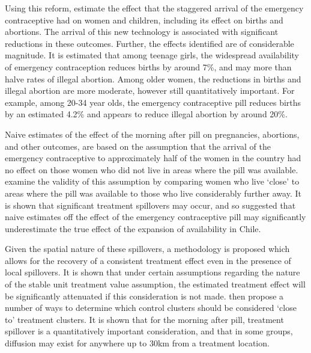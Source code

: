 Using this reform, \Person estimate the effect that the staggered arrival of the 
emergency contraceptive had on women and children, including its effect on births 
and abortions.  The arrival of this new technology is associated with significant 
reductions in these outcomes.  Further, the effects identified are of considerable
magnitude.  It is estimated that among teenage girls, the widespread availability 
of emergency contraception reduces births by around 7\%, and may more than halve 
rates of illegal abortion. Among older women, the reductions in births and illegal 
abortion are more moderate, however still quantitatively important.  For example, 
among 20-34 year olds, the emergency contraceptive pill reduces births by an 
estimated 4.2\% and appears to reduce illegal abortion by around 20\%.

\nocite{Goldin2006, Bailey2011}
\nocite{KearnerLevine2009}
\nocite{Ananatetal2007,ThomasDouglas1996,Levineetal1996}

Naive estimates of the effect of the morning after pill on pregnancies, 
abortions, and other outcomes, are based on the assumption that the arrival of
the emergency contraceptive to approximately half of the women in the country
had no effect on those women who did not live in areas where the pill was
available.  \Person examine the validity of this assumption by comparing women 
who live `close' to areas where the pill was available to those who live
considerably further away.  It is shown that significant treatment spillovers
may occur, and so suggested that naive estimates off the effect of the emergency 
contraceptive pill may significantly underestimate the true effect of the 
expansion of availability in Chile.

Given the spatial nature of these spillovers, a methodology is proposed which
allows for the recovery of a consistent treatment effect even in the presence
of local spillovers.  It is shown that under certain assumptions regarding the
nature of the stable unit treatment value assumption, the estimated treatment 
effect will be significantly attenuated if this consideration is not made.
\Person then propose a number of ways to determine which control clusters should
be considered `close to' treatment clusters.  It is shown that for the morning
after pill, treatment spillover is a quantitatively important consideration,
and that in some groups, diffusion may exist for anywhere up to 30km from a
treatment location.

